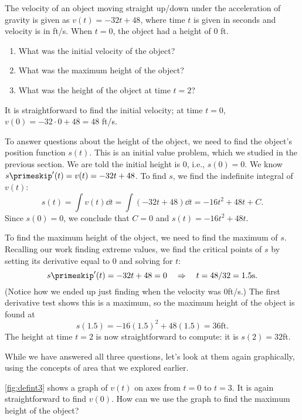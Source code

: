 \begin{example}\label{ex_defint3}%
The velocity of an object moving straight up/down under the acceleration of gravity is given as $v(t) = -32t+48$, where time $t$ is given in seconds and velocity is in ft/s. When $t=0$, the object had a height of 0 ft.
\begin{enumerate}
	\item	What was the initial velocity of the object?
	\item	What was the maximum height of the object?
	\item	What was the height of the object at time $t=2$?
\end{enumerate}
\solution
It is straightforward to find the initial velocity; at time $t=0$, $v(0) =-32\cdot 0+48 = 48 $ ft/s.

To answer questions about the height of the object, we need to find the object's position function $s(t)$. This is an initial value problem, which we studied in the previous section. We are told the initial height is 0, i.e., $s(0) = 0$. We know $s\primeskip'(t) = v(t) = -32t+48$. To find $s$, we find the indefinite integral of $v(t)$:
\[s(t)=\int v(t)\dd t = \int (-32t+48)\dd t = -16t^2+48t+C.\]
Since $s(0) = 0$, we conclude that $C=0$ and $s(t) = -16t^2+48t$.

To find the maximum height of the object, we need to find the maximum of $s$. Recalling our work finding extreme values, we find the critical points of $s$ by setting its derivative equal to 0 and solving for $t$:
\[s\primeskip'(t) = -32t+48 = 0 \quad \Rightarrow \quad t=48/32 = 1.5\text{s}.\]
(Notice how we ended up just finding when the velocity was 0ft/s.) The first derivative test shows this is a maximum, so the maximum height of the object is found at
\[s(1.5) = -16(1.5)^2+48(1.5)=36\text{ft}.\]
The height at time $t=2$ is now straightforward to compute: it is $s(2) = 32$ft.\bigskip

While we have answered all three questions, let's look at them again graphically, using the concepts of area that we explored earlier.


\autoref{fig:defint3} shows a graph of $v(t)$ on axes from $t=0$ to $t=3$. It is again straightforward to find $v(0)$. How can we use the graph to find the maximum height of the object?



\end{example}
